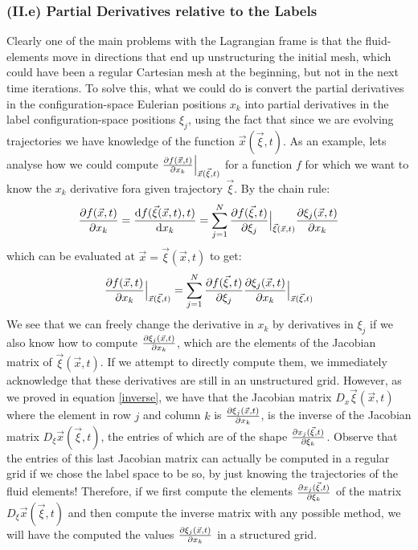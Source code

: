 \documentclass[11pt, a4paper]{article} %
\begin{document}
\subsubsection*{(II.e) Partial Derivatives relative to the Labels}
Clearly one of the main problems with the Lagrangian frame is that the fluid-elements move in directions that end up unstructuring the initial mesh, which could have been a regular Cartesian mesh at the beginning, but not in the next time iterations. To solve this, what we could do is convert the partial derivatives in the configuration-space Eulerian positions $x_k$ into partial derivatives in the label configuration-space positions $\xi_j$, using the fact that since we are evolving trajectories we have knowledge of the function $\vec{x}(\vec{\xi},t)$. As an example, lets analyse how we could compute $\pdv{f(\vec{x},t)}{x_k}\Big\rvert_{\vec{x}(\vec{\xi},t)}$ for a function $f$ for which we want to know the $x_k$ derivative fora given trajectory $\vec{\xi}$. By the chain rule:
\begin{equation}
\pdv{f(\vec{x},t)}{x_k}=\dv{f(\vec{\xi}(\vec{x},t),t)}{x_k}=\sum_{j=1}^N \pdv{f(\vec{\xi},t)}{\xi_j}\Big\rvert_{\vec{\xi}(\vec{x},t)} \pdv{\xi_j(\vec{x},t)}{x_k}
\end{equation}
which can be evaluated at $\vec{x}=\vec{\xi}(\vec{x},t)$ to get:
\begin{equation}
\pdv{f(\vec{x},t)}{x_k}\Big\rvert_{\vec{x}(\vec{\xi},t)}=\sum_{j=1}^N \pdv{f(\vec{\xi},t)}{\xi_j} \pdv{\xi_j(\vec{x},t)}{x_k}\Big\rvert_{\vec{x}(\vec{\xi},t)}
\end{equation}
We see that we can freely change the derivative in $x_k$ by derivatives in $\xi_j$ if we also know how to compute $\pdv{\xi_j(\vec{x},t)}{x_k}$, which are the elements of the Jacobian matrix of $\vec{\xi}(\vec{x},t)$. If we attempt to directly compute them, we immediately acknowledge that these derivatives are still in an unstructured grid. However, as we proved in equation \eqref{inverse}, we have that the Jacobian matrix $D_x \vec{\xi}(\vec{x},t)$ where the element in row $j$ and column $k$ is $\pdv{\xi_j(\vec{x},t)}{x_k}$, is the inverse of the Jacobian matrix $D_\xi \vec{x}(\vec{\xi},t)$, the entries of which are of the shape $\pdv{x_j(\vec{\xi},t)}{\xi_k}$. Observe that the entries of this last Jacobian matrix can actually be computed in a regular grid if we chose the label space to be so, by just knowing the trajectories of the fluid elements! Therefore, if we first compute the elements $\pdv{x_j(\vec{\xi},t)}{\xi_k}$ of the matrix $D_\xi \vec{x}(\vec{\xi},t)$ and then compute the inverse matrix with any possible method, we will have the computed the values $\pdv{\xi_j(\vec{x},t)}{x_k}$ in a structured grid.\\
\end{document}

